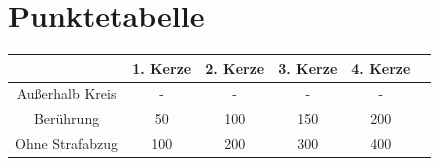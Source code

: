 \documentclass[a4paper,12pt]{article}
\begin{document}
\section{Punktetabelle}
\begin{center}
\begin{tabular}{|c|c|c|c|c|c|} \hline
	 & 1. Kerze & 2. Kerze & 3. Kerze & 4. Kerze  \\ \hline
	 Außerhalb Kreis & - & - & - & - \\ \hline
	Berührung & 50 & 100 & 150 & 200 \\ \hline
	Ohne Strafabzug & 100 & 200 & 300 & 400  \\ \hline
\end{tabular}
\end{center}
\end{document}

